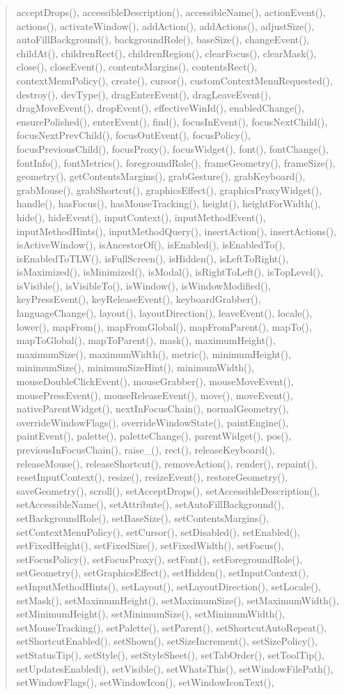 \begin{quote}
acceptDrops(), accessibleDescription(), accessibleName(), actionEvent(), actions(), activateWindow(), addAction(), addActions(), adjustSize(), autoFillBackground(), backgroundRole(), baseSize(), changeEvent(), childAt(), childrenRect(), childrenRegion(), clearFocus(), clearMask(), close(), closeEvent(), contentsMargins(), contentsRect(), contextMenuPolicy(), create(), cursor(), customContextMenuRequested(), destroy(), devType(), dragEnterEvent(), dragLeaveEvent(), dragMoveEvent(), dropEvent(), effectiveWinId(), enabledChange(), ensurePolished(), enterEvent(), find(), focusInEvent(), focusNextChild(), focusNextPrevChild(), focusOutEvent(), focusPolicy(), focusPreviousChild(), focusProxy(), focusWidget(), font(), fontChange(), fontInfo(), fontMetrics(), foregroundRole(), frameGeometry(), frameSize(), geometry(), getContentsMargins(), grabGesture(), grabKeyboard(), grabMouse(), grabShortcut(), graphicsEffect(), graphicsProxyWidget(), handle(), hasFocus(), hasMouseTracking(), height(), heightForWidth(), hide(), hideEvent(), inputContext(), inputMethodEvent(), inputMethodHints(), inputMethodQuery(), insertAction(), insertActions(), isActiveWindow(), isAncestorOf(), isEnabled(), isEnabledTo(), isEnabledToTLW(), isFullScreen(), isHidden(), isLeftToRight(), isMaximized(), isMinimized(), isModal(), isRightToLeft(), isTopLevel(), isVisible(), isVisibleTo(), isWindow(), isWindowModified(), keyPressEvent(), keyReleaseEvent(), keyboardGrabber(), languageChange(), layout(), layoutDirection(), leaveEvent(), locale(), lower(), mapFrom(), mapFromGlobal(), mapFromParent(), mapTo(), mapToGlobal(), mapToParent(), mask(), maximumHeight(), maximumSize(), maximumWidth(), metric(), minimumHeight(), minimumSize(), minimumSizeHint(), minimumWidth(), mouseDoubleClickEvent(), mouseGrabber(), mouseMoveEvent(), mousePressEvent(), mouseReleaseEvent(), move(), moveEvent(), nativeParentWidget(), nextInFocusChain(), normalGeometry(), overrideWindowFlags(), overrideWindowState(), paintEngine(), paintEvent(), palette(), paletteChange(), parentWidget(), pos(), previousInFocusChain(), raise\_(), rect(), releaseKeyboard(), releaseMouse(), releaseShortcut(), removeAction(), render(), repaint(), resetInputContext(), resize(), resizeEvent(), restoreGeometry(), saveGeometry(), scroll(), setAcceptDrops(), setAccessibleDescription(), setAccessibleName(), setAttribute(), setAutoFillBackground(), setBackgroundRole(), setBaseSize(), setContentsMargins(), setContextMenuPolicy(), setCursor(), setDisabled(), setEnabled(), setFixedHeight(), setFixedSize(), setFixedWidth(), setFocus(), setFocusPolicy(), setFocusProxy(), setFont(), setForegroundRole(), setGeometry(), setGraphicsEffect(), setHidden(), setInputContext(), setInputMethodHints(), setLayout(), setLayoutDirection(), setLocale(), setMask(), setMaximumHeight(), setMaximumSize(), setMaximumWidth(), setMinimumHeight(), setMinimumSize(), setMinimumWidth(), setMouseTracking(), setPalette(), setParent(), setShortcutAutoRepeat(), setShortcutEnabled(), setShown(), setSizeIncrement(), setSizePolicy(), setStatusTip(), setStyle(), setStyleSheet(), setTabOrder(), setToolTip(), setUpdatesEnabled(), setVisible(), setWhatsThis(), setWindowFilePath(), setWindowFlags(), setWindowIcon(), setWindowIconText(), 
\end{quote}
